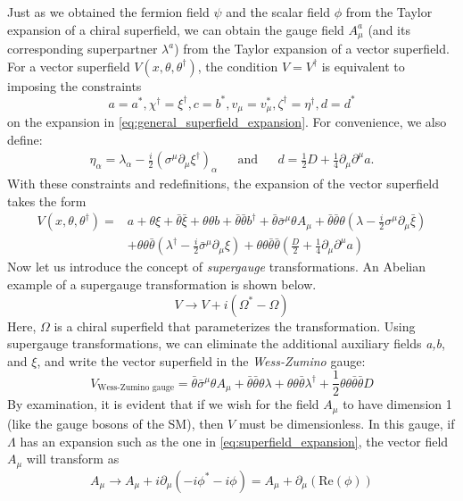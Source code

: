 Just as we obtained the fermion field $\psi$ and the scalar field $\phi$ from the Taylor expansion of a chiral superfield, we can obtain the gauge field $A_\mu^a$ (and its corresponding superpartner $\lambda^a$) from the Taylor expansion of a vector superfield.
For a vector superfield $V(x,\theta,\theta^\dagger)$, the condition $V = V^\dagger$ is equivalent to imposing the constraints
\[a = a^*, \chi^\dagger = \xi^\dagger, c = b^*, v_\mu = v_\mu^*, \zeta^\dagger = \eta^\dagger, d = d^*\]
on the expansion in \eqref{eq:general_superfield_expansion}.
For convenience, we also define:
\begin{align*}
  \eta_\alpha = \lambda_\alpha-\frac{i}{2}(\sigma^\mu\partial_\mu\xi^\dagger)_\alpha&&\text{and}&& d = \frac{1}{2}D+\frac{1}{4}\partial_\mu\partial^\mu a.
\end{align*}
With these constraints and redefinitions, the expansion of the vector superfield takes the form 
\begin{align*}
  V(x,\theta,\theta^\dagger) =& a + \theta\xi + \bar{\theta}\bar{\xi} + \theta\theta b+\bar{\theta}\bar{\theta}b^\dagger + \bar{\theta}\bar{\sigma}^\mu\theta A_\mu + \bar{\theta}\bar{\theta}\theta\left(\lambda-\frac{i}{2}\sigma^\mu\partial_\mu\bar{\xi}\right)\\
  &+\theta\theta\bar{\theta}\left(\lambda^\dagger-\frac{i}{2}\bar{\sigma}^\mu\partial_\mu\xi\right)+\theta\theta\bar{\theta}\bar{\theta}\left(\frac{D}{2}+\frac{1}{4}\partial_\mu\partial^\mu a \right)
\end{align*}
Now let us introduce the concept of \emph{supergauge} transformations. An Abelian example of a supergauge transformation is shown below.
\[V\rightarrow V+i(\Omega^*-\Omega)\]
Here, $\Omega$ is a chiral superfield that parameterizes the transformation.
Using supergauge transformations, we can eliminate the additional auxiliary fields \emph{a,b}, and $\xi$, and write the vector superfield in the \emph{Wess-Zumino} gauge:
\[V_{\text{Wess-Zumino gauge}} = \bar{\theta}\bar{\sigma}^\mu\theta A_\mu + \bar{\theta}\bar{\theta}\theta\lambda+\theta\theta\bar{\theta}\lambda^\dagger + \frac{1}{2}\theta\theta\bar{\theta}\bar{\theta}D\]
By examination, it is evident that if we wish for the field $A_\mu$ to have dimension 1 (like the gauge bosons of the SM), then $V$ must be dimensionless. In this gauge, if $\Lambda$ has an expansion such as the one in \eqref{eq:superfield_expansion}, the vector field $A_\mu$ will transform as
\begin{equation}
A_\mu\rightarrow A_\mu + i\partial_{\mu}(-i\phi^*-i\phi) = A_\mu + \partial_\mu( \text{Re}(\phi))
\label{eq:amu_supergauge_transformation}
\end{equation}
